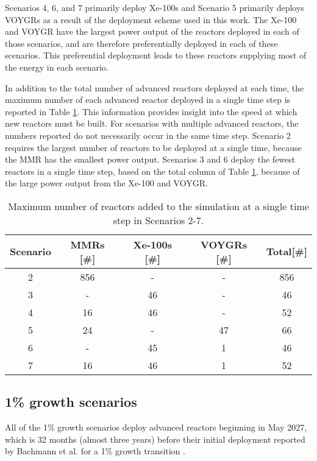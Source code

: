 Scenarios 4, 6, and 7 primarily deploy Xe-100s and Scenario 5 primarily deploys 
VOYGRs as a result of the deployment scheme used in this work. The Xe-100 and 
VOYGR have the largest power output of the reactors deployed in each of those 
scenarios, and are therefore preferentially deployed in each of these scenarios.
This preferential deployment leads to these reactors supplying most of 
the energy in each scenario.  

In addition to the total number of advanced reactors deployed 
at each time, the maximum number of each advanced reactor deployed in a 
single time step is reported in Table 
\ref{tab:reactors_added_nogrowth}. This information provides insight 
into the speed at which new reactors must be built. For scenarios with 
multiple advanced reactors, the numbers reported do not necessarily occur 
in the same time step. Scenario 2 requires 
the largest number of reactors to be deployed at a single time, because 
the \gls{MMR} has the smallest power output. Scenarios 3 and 
6 deploy the fewest reactors in 
a single time step, based on the total column of Table 
\ref{tab:reactors_added_nogrowth}, because of the large power output from 
the Xe-100 and VOYGR. 

\begin{table}[h!]
    \centering 
    \caption{Maximum number of reactors added to the simulation at a 
    single time step in Scenarios 2-7.}
    \label{tab:reactors_added_nogrowth}
    \begin{tabular}{c c c c c}
        \hline
        Scenario & \glspl{MMR} [\#]& Xe-100s [\#]& VOYGRs [\#]
        & Total[\#]\\\hline
        2 & 856 & - & - & 856\\
        3 & - & 46 & - & 46\\
        4 & 16 & 46 & - & 52\\
        5 & 24 & - & 47 & 66\\
        6 & - & 45 & 1 & 46\\
        7 & 16 & 46 & 1 & 52\\
        \hline
    \end{tabular}
\end{table}

\subsection{1\% growth scenarios} \label{sec:1percent_reactors}
All of the 1\% growth scenarios deploy advanced reactors beginning 
in May 2027, which is 32 months (almost three years) before their initial 
deployment reported by Bachmann et al. for a 1\% growth transition 
\cite{bachmann_enrichment_2021}.

